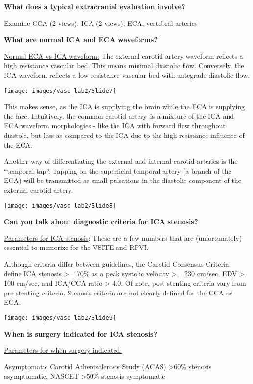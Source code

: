 \documentclass[
]{book}
\begin{document}
\textbf{What does a typical extracranial evaluation involve?}

Examine CCA (2 views), ICA (2 views), ECA, vertebral arteries

\textbf{What are normal ICA and ECA waveforms?}

\uline{Normal ECA vs ICA waveform:} The external carotid artery
waveform reflects a high resistance vascular bed. This means minimal
diastolic flow. Conversely, the ICA waveform reflects a low resistance
vascular bed with antegrade diastolic flow.

\texttt{[image: images/vasc\_lab2/Slide7]}

This makes sense, as the ICA is supplying the brain while the ECA is
supplying the face. Intuitively, the common carotid artery~is a mixture
of the ICA and ECA waveform morphologies - like the ICA with forward
flow throughout diastole, but less as compared to the ICA due to the
high-resistance influence of the ECA.

Another way of differentiating the external and internal carotid
arteries is the ``temporal tap''. Tapping on the superficial temporal
artery (a branch of the ECA) will be transmitted as small pulsations in
the diastolic component of the external carotid artery.\citep{pellerito2019, size2013}

\texttt{[image: images/vasc\_lab2/Slide8]}

\textbf{Can you talk about diagnostic criteria for ICA stenosis?}

\uline{Parameters for ICA stenosis}: These are a few numbers that
are (unfortunately) essential to memorize for the VSITE and RPVI.

Although criteria differ between guidelines, the Carotid Consensus
Criteria, define ICA stenosis \textgreater= 70\% as a peak systolic velocity \textgreater=
230 cm/sec, EDV \textgreater{} 100 cm/sec, and ICA/CCA ratio \textgreater{} 4.0. Of note,
post-stenting criteria vary from pre-stenting criteria. Stenosis
criteria are not clearly defined for the CCA or ECA.

\texttt{[image: images/vasc\_lab2/Slide9]}

\textbf{When is surgery indicated for ICA stenosis?}

\uline{Parameters for when surgery indicated:}

Asymptomatic Carotid Atherosclerosis Study (ACAS) \textgreater60\% stenosis
asymptomatic, NASCET \textgreater50\% stenosis symptomatic
\end{document}
